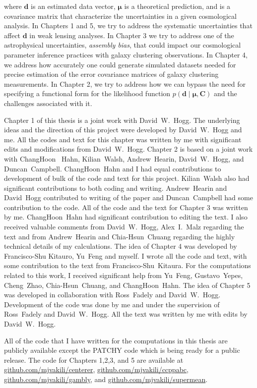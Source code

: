 where $\mathbf{d}$ is an estimated data vector, $\mathbf{\mu}$ is a theoretical prediction, and  is a covariance matrix that characterize the uncertainties in 
a given cosmological analysis. In Chapters 1 and 5, we try to address the systematic uncertainties that affect $\mathbf{d}$ in weak lensing analyses. In Chapter 3 we try to address one of the astrophysical uncertainties, \emph{assembly bias}, that could impact our cosmological parameter inference practices with galaxy clustering observations. In Chapter 4, we address how accurately one could generate simulated datasets needed for precise estimation of the error covariance matrices of galaxy clustering measurements. In Chapter 2, we try to address how we can bypass the need for specifying a functional form for the likelihood function $p(\mathbf{d} \; | \; \mathbf{\mu} , \mathbf{C})$ and the challenges associated with it.

Chapter 1 of this thesis is a joint work with David~W.~Hogg. The underlying ideas and the direction of this project were developed by David~W.~Hogg and me. 
All the codes and text for this chapter was written by me with significant edits and modifications from David~W.~Hogg. Chapter 2 is based on a joint work with ChangHoon~ Hahn, Kilian~Walsh, Andrew~Hearin, David~W.~Hogg, and Duncan~Campbell. ChangHoon~Hahn and I had equal contributions to development of bulk of the code and text for this project. Kilian~Walsh also had significant contributions to both coding and writing. Andrew~Hearin and David~Hogg contributed to writing of the paper and Duncan~Campbell had some contribution 
to the code. All of the code and the text for Chapter 3 was written by me. ChangHoon~Hahn had significant contribution to editing the text. I also received valuable comments from 
David~W.~Hogg, Alex~I.~Malz regarding the text and from Andrew~Hearin and Chia-Hsun~Chuang regarding the highly technical details of my calculations. The idea of Chapter 4 was developed by Francisco-Shu Kitauro, Yu~Feng and myself. I wrote all the code and text, with some contribution to the text from Francisco-Shu~Kitaura. For the computations related to this work, I received significant help from Yu~Feng, Gustavo~Yepes, Cheng~Zhao, Chia-Hsun~Chuang, and ChangHoon~Hahn. The idea of Chapter 5 was developed in collaboration with Ross~Fadely and David~W.~Hogg. Development of the code was done by me and under the supervision of Ross~Fadely and David~W.~Hogg. All the text was written by me with edits by David~W.~Hogg.

All of the code that I have written for the computations in this thesis are publicly available except the PATCHY code which is being ready for a public release. 
The code for Chapters 1,2,3, and 5 are available at \url{github.com/mjvakili/centerer}, \url{github.com/mjvakili/ccppabc}, \url{github.com/mjvakili/gambly}, and \url{github.com/mjvakili/supermean}.

